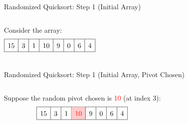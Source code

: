 
\begin{frame}{Randomized Quicksort: Step 1 (Initial Array)}
  \begin{columns}[t]
    Consider the array:
    \[
      \renewcommand{\arraystretch}{1.5}
      \begin{array}{|c|c|c|c|c|c|c|c|}
        \hline
        15 & 3 & 1 & 10 & 9 & 0 & 6 & 4 \\
        \hline
      \end{array}
    \]
  \end{columns}
\end{frame}

\begin{frame}{Randomized Quicksort: Step 1 (Initial Array, Pivot Chosen)}
  \begin{columns}[t]
    Suppose the random pivot chosen is \textcolor{red}{10} (at index 3):
    \[
      \renewcommand{\arraystretch}{1.5}
      \begin{array}{|c|c|c|c|c|c|c|c|}
        \hline
        15 & 3 & 1 & \cellcolor{red!20}\textcolor{red}{10} & 9 & 0 & 6 & 4 \\
        \hline
      \end{array}
    \]
    \begin{minipage}[t]{\linewidth}
      \vspace{0pt}
      \begin{center}
      \end{center}
    \end{minipage}
  \end{columns}
\end{frame}
